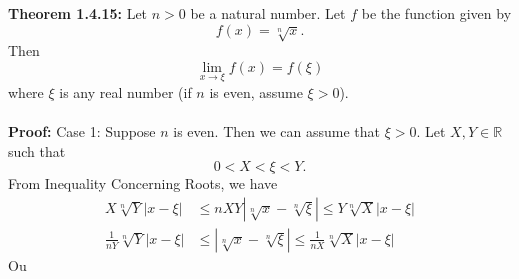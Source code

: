 \documentclass{article}
\begin{document}
	\textbf{Theorem 1.4.15:} Let $n > 0$ be a natural number. Let $f$ be the function given by 
	$$f(x) = \sqrt[n]{x}.$$
	Then
	$$\lim_{x \to \xi}{f(x)} = f(\xi)$$
	where $\xi$ is any real number (if $n$ is even, assume $\xi > 0$). \\\\
	\textbf{Proof:}
	Case 1: Suppose $n$ is even. Then we can assume that $\xi > 0$. Let $X, Y \in \mathbb{R}$ such that
	$$0 < X < \xi < Y.$$
	From Inequality Concerning Roots, we have
	\begin{align*}
		X\sqrt[n]{Y}|x - \xi| &\leq nXY|\sqrt[n]{x} - \sqrt[n]{\xi}| \leq Y\sqrt[n]{X}|x-\xi| \\
		\frac{1}{nY}\sqrt[n]{Y}|x - \xi| &\leq |\sqrt[n]{x} - \sqrt[n]{\xi}| \leq \frac{1}{nX}\sqrt[n]{X}|x-\xi| \tag{Divide by nXY}
	\end{align*}
	Ou
\end{document}
